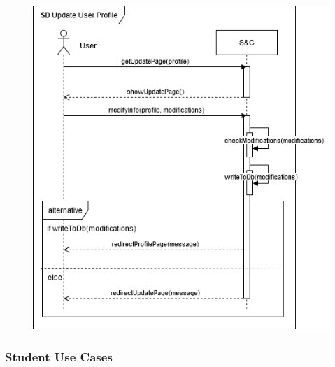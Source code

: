 \begin{enumerate}[label=\textbf{[US\arabic*]}, left = 0pt, align = left]
\begin{longtable}{|l|p{11cm}|}
            \end{longtable}
        
            \newpage          
            \begin{figure}[h!]
                \centering
                    \includegraphics[width=1\textwidth]{RASD/Images/UseCases/US03_UserUpdate.drawio.png}
                \label{fig:example}
            \end{figure}

        \end{enumerate}

    \newpage
    \subsubsection{Student Use Cases}
    
